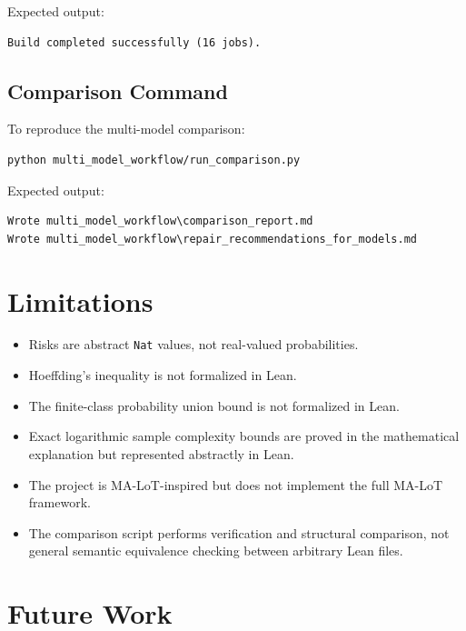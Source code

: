 \documentclass[11pt]{article}
\theoremstyle{definition}
\begin{document}
Expected output:

\begin{verbatim}
Build completed successfully (16 jobs).
\end{verbatim}

\subsection{Comparison Command}

To reproduce the multi-model comparison:

\begin{verbatim}
python multi_model_workflow/run_comparison.py
\end{verbatim}

Expected output:

\begin{verbatim}
Wrote multi_model_workflow\comparison_report.md
Wrote multi_model_workflow\repair_recommendations_for_models.md
\end{verbatim}

\section{Limitations}

\begin{itemize}[leftmargin=*]
  \item Risks are abstract \texttt{Nat} values, not real-valued probabilities.
  \item Hoeffding's inequality is not formalized in Lean.
  \item The finite-class probability union bound is not formalized in Lean.
  \item Exact logarithmic sample complexity bounds are proved in the mathematical
  explanation but represented abstractly in Lean.
  \item The project is MA-LoT-inspired but does not implement the full MA-LoT
  framework.
  \item The comparison script performs verification and structural comparison,
  not general semantic equivalence checking between arbitrary Lean files.
\end{itemize}

\section{Future Work}
\end{document}
